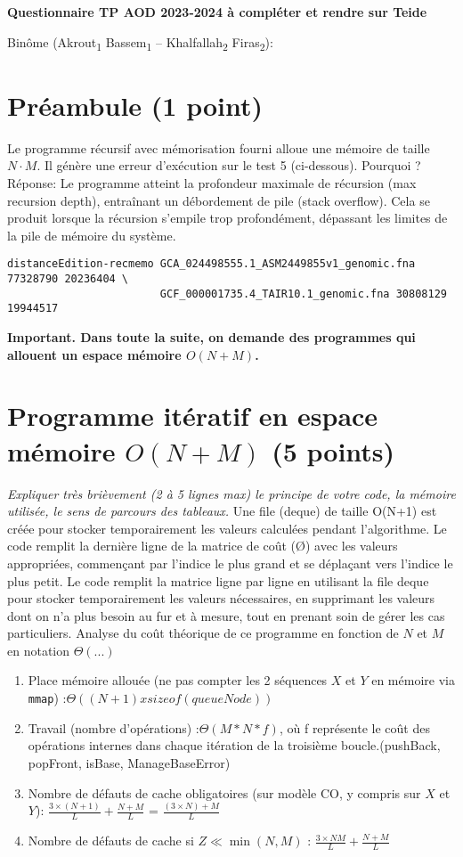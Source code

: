 \documentclass[10pt,a4paper]{article}
\begin{document}
\thispagestyle{empty}

\noindent\centerline{\bf\large Questionnaire TP AOD 2023-2024 à compléter et rendre sur Teide}
Binôme (Akrout\textsubscript{1} Bassem\textsubscript{1} -- Khalfallah\textsubscript{2} Firas\textsubscript{2}): \dotfill

\section{Préambule (1 point)}
Le programme récursif avec mémorisation fourni alloue une mémoire de taille $N \cdot M$. Il génère une erreur d'exécution sur le test 5 (ci-dessous). Pourquoi ?
Réponse: Le programme atteint la profondeur maximale de récursion (max recursion depth), entraînant un débordement de pile (stack overflow). Cela se produit lorsque la récursion s'empile trop profondément, dépassant les limites de la pile de mémoire du système.
\begin{verbatim}
distanceEdition-recmemo GCA_024498555.1_ASM2449855v1_genomic.fna 77328790 20236404 \
                        GCF_000001735.4_TAIR10.1_genomic.fna 30808129 19944517
\end{verbatim}

{\noindent\bf{Important.} Dans toute la suite, on demande des programmes qui allouent un espace mémoire $O(N+M)$.}

\section{Programme itératif en espace mémoire $O(N+M)$ (5 points)}
{\em Expliquer très brièvement (2 à 5 lignes max) le principe de votre code, la mémoire utilisée, le sens de parcours des tableaux.}
\vspace*{1.0cm}
Une file (deque) de taille O(N+1) est créée pour stocker temporairement les valeurs calculées pendant l'algorithme.
Le code remplit la dernière ligne de la matrice de coût (Ø) avec les valeurs appropriées, commençant par l'indice le plus grand et se déplaçant vers l'indice le plus petit.
Le code remplit la matrice ligne par ligne en utilisant la file deque pour stocker temporairement les valeurs nécessaires, en supprimant les valeurs dont on n'a plus besoin au fur et à mesure, tout en prenant soin de gérer les cas particuliers.
Analyse du coût théorique de ce programme en fonction de $N$ et $M$ en notation $\Theta(...)$
\begin{enumerate}
  \item Place mémoire allouée (ne pas compter les 2 séquences $X$ et $Y$ en mémoire via {\tt mmap}) :$\Theta( (N + 1) x sizeof(queueNode))$
  \item Travail (nombre d'opérations) :$\Theta(M * N * f)$, où f représente le coût des opérations internes dans chaque itération de la troisième boucle.(pushBack, popFront, isBase, ManageBaseError)
  \item Nombre de défauts de cache obligatoires (sur modèle CO, y compris sur $X$ et $Y$): $\frac{3 \times (N + 1)}{L} +\frac{N + M}{L}$ = $\frac{(3 \times N) + M}{L}$
  \item Nombre de défauts de cache si $Z \ll \min(N,M)$ : $\frac{3 \times N M}{L} +\frac{N + M}{L}$ 
\end{enumerate}
\end{document}
